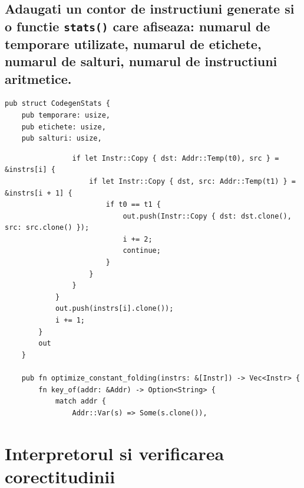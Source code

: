 \documentclass[11pt]{article}
\begin{document}
\subsection{Adaugati un contor de instructiuni generate si o functie \texttt{stats()} care afiseaza: numarul de temporare utilizate, numarul de etichete, numarul de salturi, numarul de instructiuni aritmetice.}
\label{sec:org1b845f8}
\begin{verbatim}
pub struct CodegenStats {
    pub temporare: usize,
    pub etichete: usize,
    pub salturi: usize,
\end{verbatim}
\begin{verbatim}
                if let Instr::Copy { dst: Addr::Temp(t0), src } = &instrs[i] {
                    if let Instr::Copy { dst, src: Addr::Temp(t1) } = &instrs[i + 1] {
                        if t0 == t1 {
                            out.push(Instr::Copy { dst: dst.clone(), src: src.clone() });
                            i += 2;
                            continue;
                        }
                    }
                }
            }
            out.push(instrs[i].clone());
            i += 1;
        }
        out
    }

    pub fn optimize_constant_folding(instrs: &[Instr]) -> Vec<Instr> {
        fn key_of(addr: &Addr) -> Option<String> {
            match addr {
                Addr::Var(s) => Some(s.clone()),
\end{verbatim}
\section{Interpretorul si verificarea corectitudinii}
\label{sec:org3fde7eb}
\end{document}
